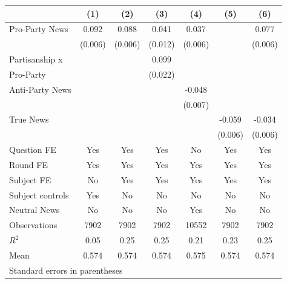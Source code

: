 \begin{tabular}{l*{6}{c}}
\hline\hline
                    &\multicolumn{1}{c}{(1)}&\multicolumn{1}{c}{(2)}&\multicolumn{1}{c}{(3)}&\multicolumn{1}{c}{(4)}&\multicolumn{1}{c}{(5)}&\multicolumn{1}{c}{(6)}\\
\hline
Pro-Party News      &    0.092&    0.088&    0.041&    0.037&         &    0.077\\
                    &  (0.006)&  (0.006)&  (0.012)&  (0.006)&         &  (0.006)\\
Partisanship x      &         &         &    0.099&         &         &         \\
Pro-Party           &         &         &  (0.022)&         &         &         \\
Anti-Party News     &         &         &         &   -0.048&         &         \\
                    &         &         &         &  (0.007)&         &         \\
True News           &         &         &         &         &   -0.059&   -0.034\\
                    &         &         &         &         &  (0.006)&  (0.006)\\
Question FE         &      Yes&      Yes&      Yes&       No&      Yes&      Yes\\
Round FE            &      Yes&      Yes&      Yes&      Yes&      Yes&      Yes\\
Subject FE          &       No&      Yes&      Yes&      Yes&      Yes&      Yes\\
Subject controls    &      Yes&       No&       No&       No&       No&       No\\
Neutral News        &       No&       No&       No&      Yes&       No&       No\\
\hline
Observations        &     7902&     7902&     7902&    10552&     7902&     7902\\
\(R^{2}\)           &     0.05&     0.25&     0.25&     0.21&     0.23&     0.25\\
Mean                &    0.574&    0.574&    0.574&    0.575&    0.574&    0.574\\
\hline\hline
\multicolumn{7}{l}{\footnotesize Standard errors in parentheses}\\
\end{tabular}
